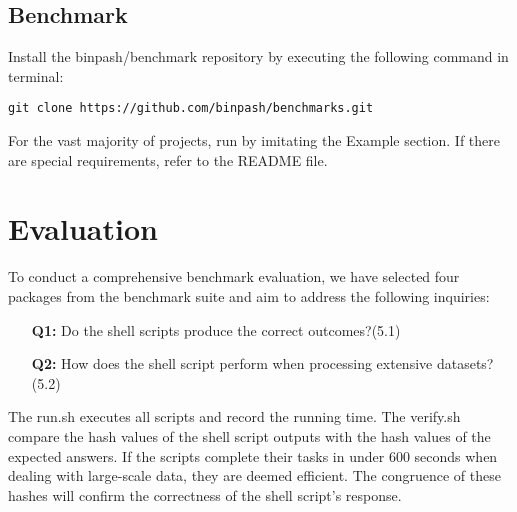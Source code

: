 \documentclass[sigplan, screen, 10pt]{acmart}
\begin{document}
\subsection{Benchmark}
Install the binpash/benchmark repository by executing the following command in terminal:
\begin{verbatim}
git clone https://github.com/binpash/benchmarks.git
\end{verbatim}
For the vast majority of projects, run by imitating the Example section.
If there are special requirements, refer to the README file.


\section{Evaluation}
\label{eval}
To conduct a comprehensive benchmark evaluation, we have selected four packages from the benchmark suite and aim to address the following inquiries:
\begin{itemize}
\item[\textbf{Q1:}] Do the shell scripts produce the correct outcomes?(5.1)
\item[\textbf{Q2:}] How does the shell script perform when processing extensive datasets?(5.2)
\end{itemize}
The run.sh executes all scripts and record the running time.
The verify.sh compare the hash values of the shell script outputs with the hash values of the expected answers.
If the scripts complete their tasks in under 600 seconds when dealing with large-scale data, they are deemed efficient.
The congruence of these hashes will confirm the correctness of the shell script's response.
\end{document}
